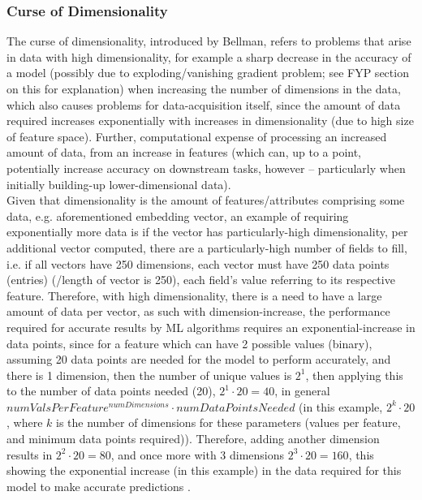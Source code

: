 \subsubsection{Curse of Dimensionality}%
\label{subsubsec:curse_of_dimensionality}
The curse of dimensionality, introduced by Bellman, refers to problems that arise in data with high dimensionality, for example a sharp decrease in the accuracy of a model (possibly due to exploding/vanishing gradient problem; see FYP section on this for explanation) when increasing the number of dimensions in the data, which also causes problems for data-acquisition itself, since the amount of data required increases exponentially with increases in dimensionality (due to high size of feature space). Further, computational expense of processing an increased amount of data, from an increase in features (which can, up to a point, potentially increase accuracy on downstream tasks, however -- particularly when initially building-up lower-dimensional data).\\
Given that dimensionality is the amount of features/attributes comprising some data, e.g. aforementioned embedding vector, an example of requiring exponentially more data is if the vector has particularly-high dimensionality, per additional vector computed, there are a particularly-high number of fields to fill, i.e. if all vectors have 250 dimensions, each vector must have 250 data points (entries) (/length of vector is 250), each field's value referring to its respective feature. Therefore, with high dimensionality, there is a need to have a large amount of data per vector, as such with dimension-increase, the performance required for accurate results by ML algorithms requires an exponential-increase in data points, since for a feature which can have 2 possible values (binary), assuming 20 data points are needed for the model to perform accurately, and there is 1 dimension, then the number of unique values is $2^1$, then applying this to the number of data points needed (20), $2^1\cdot20 = 40$, in general $numValsPerFeature^{numDimensions}\cdot numDataPointsNeeded$ (in this example, $2^k\cdot 20$, where $k$ is the number of dimensions for these parameters (values per feature, and minimum data points required)). Therefore, adding another dimension results in $2^2\cdot20 = 80$, and once more with 3 dimensions $2^3\cdot20 = 160$, this showing the exponential increase (in this example) in the data required for this model to make accurate predictions \citep{towardsdatascience:curse_of_dimensionality}. %
